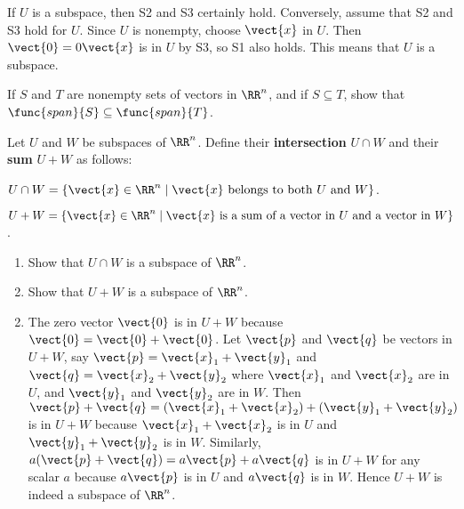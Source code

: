 \begin{multicols}{2}
\begin{ex}
\begin{sol}
If $U$ is a subspace, then S2 and S3 certainly hold. Conversely, assume that S2 and S3 hold for $U$. Since $U$ is nonempty, choose $\vect{x}$ in $U$. Then $\vect{0} = 0\vect{x}$ is in $U$ by S3, so S1 also holds. This means that $U$ is a subspace.
\end{sol}
\end{ex}

\begin{ex}
If $S$ and $T$ are nonempty sets of vectors in $\RR^n$, and if $S \subseteq T$, show that $\func{span}\{S\} \subseteq \func{span}\{T\}$.
\end{ex}

\begin{ex}\label{ex:5_1_22}
Let $U$ and $W$ be subspaces of $\RR^n$. Define their \textbf{intersection} $U \cap W$ and their \textbf{sum} $U + W$ as follows:

$U \cap W = \{\vect{x} \in \RR^n \mid \vect{x}\mbox{ belongs to both } U \mbox{ and } W\}$. 

$U + W = \{\vect{x} \in \RR^n \mid \vect{x}\mbox{ is a sum of a vector in } U \\ \mbox{ and a vector in } W\}$.

\begin{enumerate}[label={\alph*.}]
\item Show that $U \cap W$ is a subspace of $\RR^n$.

\item Show that $U + W$ is a subspace of $\RR^n$.

\end{enumerate}
\begin{sol}
\begin{enumerate}[label={\alph*.}]
\setcounter{enumi}{1}
\item  The zero vector $\vect{0}$ is in $U + W$ because $\vect{0} = \vect{0} + \vect{0}$. Let $\vect{p}$ and $\vect{q}$ be vectors in $U + W$, say $\vect{p} = \vect{x}_{1} + \vect{y}_{1}$ and $\vect{q} = \vect{x}_{2} + \vect{y}_{2}$ where $\vect{x}_{1}$ and $\vect{x}_{2}$ are in $U$, and $\vect{y}_{1}$ and $\vect{y}_{2}$ are in $W$. Then $\vect{p} + \vect{q} = (\vect{x}_{1} + \vect{x}_{2}) + (\vect{y}_{1} + \vect{y}_{2})$ is in $U + W$ because $\vect{x}_{1} + \vect{x}_{2}$ is in $U$ and $\vect{y}_{1} + \vect{y}_{2}$ is in $W$. Similarly, $a(\vect{p} + \vect{q}) = a\vect{p} + a\vect{q}$ is in $U + W$ for any scalar $a$ because $a\vect{p}$ is in $U$ and $a\vect{q}$ is in $W$. Hence $U + W$ is indeed a subspace of $\RR^n$.


\end{enumerate}
\end{sol}
\end{ex}
\end{multicols}
